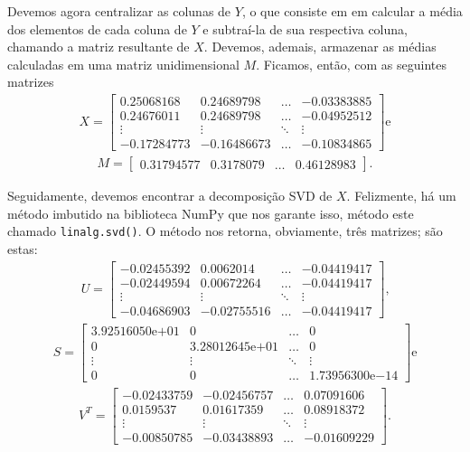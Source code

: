 \documentclass[a4paper,12pt]{article}
\begin{document}
Devemos agora centralizar as colunas de $Y$, o que consiste em em calcular a média dos elementos de cada coluna de $Y$ e subtraí-la de sua respectiva coluna, chamando a matriz resultante de $X$. Devemos, ademais, armazenar as médias calculadas em uma matriz unidimensional $M$. Ficamos, então, com as seguintes matrizes
\begin{align*}
X = 
\begin{bmatrix}
0.25068168 & 0.24689798 & \dots & -0.03383885\\
0.24676011 & 0.24689798 & \dots & -0.04952512\\
\vdots & \vdots & \ddots & \vdots\\
-0.17284773 & -0.16486673 & \dots & -0.10834865
\end{bmatrix} \text{e}
\end{align*}
\begin{align*}
M = 
\begin{bmatrix}
0.31794577 & 0.3178079 & \dots & 0.46128983
\end{bmatrix}.
\end{align*}

Seguidamente, devemos encontrar a decomposição SVD de $X$. Felizmente, há um método imbutido na biblioteca NumPy que nos garante isso, método este chamado \texttt{linalg.svd()}. O método nos retorna, obviamente, três matrizes; são estas:
\begin{align*}
U = 
\begin{bmatrix}
-0.02455392 & 0.0062014 & \dots & -0.04419417\\
-0.02449594 & 0.00672264 & \dots & -0.04419417\\
\vdots & \vdots & \ddots & \vdots\\
-0.04686903 & -0.02755516 & \dots & -0.04419417
\end{bmatrix} \text{,}
\end{align*}
\begin{align*}
S = 
\begin{bmatrix}
3.92516050\mathrm{e}{+01} & 0 & \dots & 0\\ 
0 & 3.28012645\mathrm{e}{+01} & \dots & 0\\
\vdots & \vdots & \ddots & \vdots\\
0 & 0 & \dots & 1.73956300\mathrm{e}{-14}
\end{bmatrix} \text{e}
\end{align*}
\begin{align*}
V^{T} = 
\begin{bmatrix}
-0.02433759 & -0.02456757 & \dots & 0.07091606\\
0.0159537 & 0.01617359 & \dots & 0.08918372\\
\vdots & \vdots & \ddots & \vdots\\
-0.00850785 & -0.03438893 & \dots & -0.01609229
\end{bmatrix}.
\end{align*}
\end{document}
